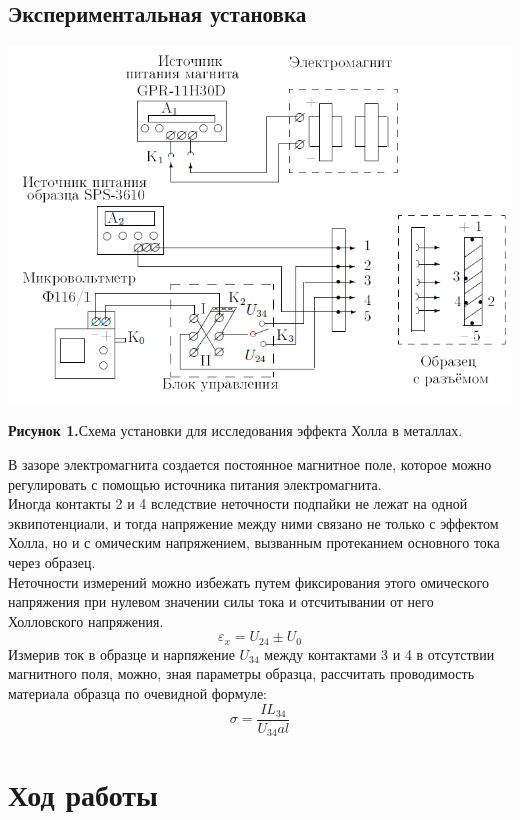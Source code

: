 \documentclass[a4paper,12pt]{article}
\theoremstyle{definition}
\begin{document}
\subsection*{Экспериментальная установка}
\includegraphics[width = \textwidth]{5.png}\\
\begin{center}
\textbf{Рисунок 1.}Схема установки для исследования эффекта Холла в металлах.
\end{center}
В зазоре электромагнита создается постоянное магнитное поле, которое можно регулировать с помощью источника питания электромагнита.\\
Иногда контакты 2 и 4 вследствие неточности подпайки не лежат на одной эквипотенциали, и тогда напряжение между ними связано не только с эффектом Холла, но и с омическим напряжением, вызванным протеканием основного тока через образец. \\
Неточности измерений можно избежать путем фиксирования этого омического напряжения при нулевом значении силы тока и отсчитывании от него Холловского напряжения. 
\[\varepsilon_x = U_{24} \pm U_0\]
Измерив ток в образце и нарпяжение $U_{34}$ между контактами 3 и 4 в отсутствии магнитного поля, можно, зная параметры образца, рассчитать проводимость материала образца по очевидной формуле:
\begin{equation}
\sigma = \dfrac{I L_{34}}{U_{34}al}
\end{equation}

\section{Ход работы}
\end{document}
